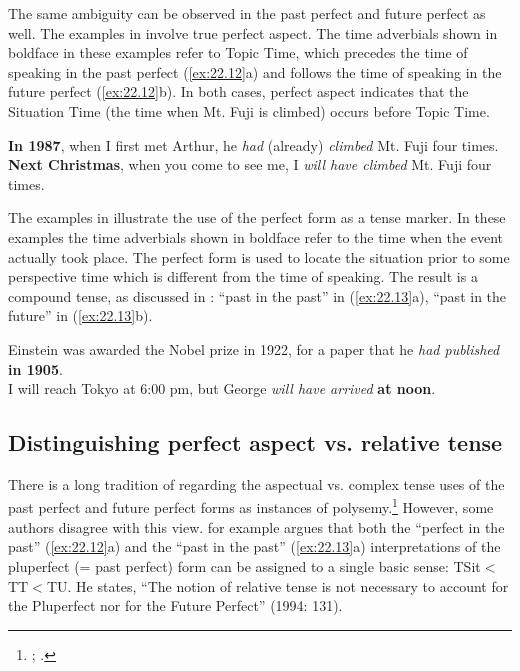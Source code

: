 The same ambiguity can be observed in the past perfect and future perfect as well. The examples in  involve true perfect aspect. The time adverbials shown in boldface in these examples refer to Topic Time, which precedes the time of speaking in the past perfect (\ref{ex:22.12}a) and follows the time of speaking in the future perfect (\ref{ex:22.12}b). In both cases, perfect aspect indicates that the Situation Time (the time when Mt. Fuji is climbed) occurs before Topic Time.


\ea \label{ex:22.12}
\ea \textbf{In 1987}, when I first met Arthur, he \textit{had} (already) \textit{climbed} Mt. Fuji four times.\\
\ex \textbf{Next Christmas}, when you come to see me, I \textit{will have climbed} Mt. Fuji four times.
                       \z
\z


The examples in  illustrate the use of the perfect form as a tense marker. In these examples the time adverbials shown in boldface refer to the time when the event actually took place. The perfect form is used to locate the situation prior to some perspective time which is different from the time of speaking. The result is a compound tense, as discussed in : “past in the past” in (\ref{ex:22.13}a), “past in the future” in (\ref{ex:22.13}b).


\ea \label{ex:22.13}
\ea Einstein was awarded the Nobel prize in 1922, for a paper that he \textit{had published} \textbf{in 1905}.\\
\ex I will reach Tokyo at 6:00 pm, but George \textit{will have arrived} \textbf{at noon}.
                       \z
\z

\subsection{Distinguishing perfect aspect vs. relative tense}\label{sec:22.3.2}

There is a long tradition of regarding the aspectual vs. complex tense uses of the past perfect and future perfect forms as instances of polysemy.\footnote{\citet{Jespersen1924}; \citet{Comrie1976}.} However, some authors disagree with this view. \citet{Klein1994} for example argues that both the “perfect in the past” (\ref{ex:22.12}a) and the “past in the past” (\ref{ex:22.13}a) interpretations of the pluperfect (= past perfect) form can be assigned to a single basic sense: TSit${<}$TT${<}$TU. He states, “The notion of relative tense is not necessary to account for the Pluperfect nor for the Future Perfect” (1994: 131).



